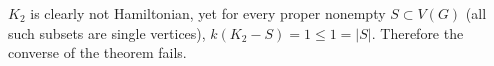 $K_2$ is clearly not Hamiltonian, yet for every proper nonempty
$S \subset V(G)$ (all such subsets are single vertices), $k(K_2-S) = 1
\le 1 = |S|$. Therefore the converse of the theorem fails.
